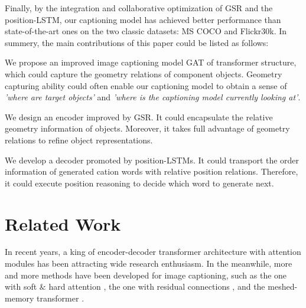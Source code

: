 \documentclass[review]{elsarticle}
\begin{document}
Finally, by the integration and collaborative optimization of {GSR} and the {position-LSTM}, our captioning model has achieved better performance than state-of-the-art ones on the two classic datasets: MS COCO and Flickr30k.
In summery, the main contributions of this paper could be listed as follows:
\begin{list}{}{\leftmargin=1em}
    \setlength{\topmargin}{0pt}
    \setlength{\itemsep}{0em}
    \setlength{\parskip}{0pt}
    \setlength{\parsep}{0pt}

    \item We propose an improved image captioning model {GAT} of transformer structure, which could capture the geometry relations of component objects. Geometry capturing ability could often enable our captioning model to obtain a sense of \emph{'where are target objects'} and \emph{'where is the captioning model currently looking at'}.

    \item We design an encoder improved by {GSR}. It could encapsulate the relative geometry information of objects. Moreover, it takes full advantage of geometry relations to refine object representations.

    \item We develop a decoder promoted by position-LSTMs. It could transport the order information of generated cation words with relative position relations. Therefore, it could execute position reasoning to decide which word to generate next. %
\end{list}
\section{Related Work}

 In recent years, a king of encoder-decoder transformer architecture with attention modules has been attracting wide research enthusiasm. In the meanwhile, more and more methods have been developed for image captioning, such as the one with soft $\&$ hard attention \cite{xu2015show}, the one with residual connections \cite{gao2019deliberate}, and the meshed-memory transformer \cite{ cornia2020meshed}.
\end{document}
